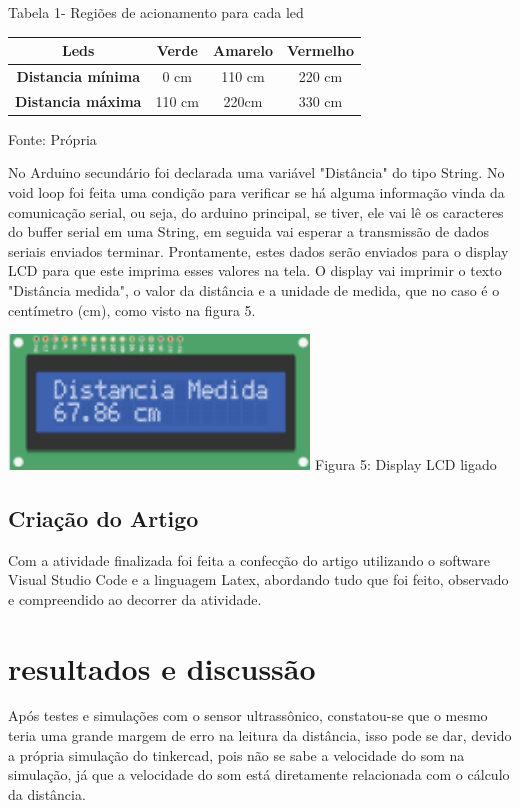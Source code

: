\documentclass[conference]{IEEEtran}
\begin{document}
\begin{center}
   Tabela 1- Regiões de acionamento para cada led
\end{center}
\begin{tabular}{c|c|c|c}\hline
\textbf{Leds} & \textbf{Verde} & \textbf{Amarelo} & \textbf{Vermelho}  \\\hline
   \textbf{Distancia mínima}  & 0 cm & 110 cm & 220 cm \\
     \textbf{Distancia máxima} & 110 cm & 220cm & 330 cm \\ 
\end{tabular}
\begin{center}
  Fonte: Própria
\end{center}

 No Arduino secundário foi declarada uma variável "Distância" do tipo String. No void loop foi feita uma condição para verificar se há alguma informação vinda da comunicação serial, ou seja, do arduino principal, se tiver, ele vai lê os caracteres do buffer serial em uma String, em seguida vai esperar a transmissão de dados seriais enviados terminar. Prontamente, estes dados serão enviados para o display LCD para que este imprima esses valores na tela. O display vai imprimir o texto "Distância medida", o valor da distância e a unidade de medida, que no caso é o centímetro (cm), como visto na figura 5.
\begin{center}
    \includegraphics[width=8cm]{LCD-on.png}
    Figura 5: Display LCD ligado
\end{center}

\subsection{Criação do Artigo}
Com a atividade finalizada foi feita a confecção do artigo utilizando o software Visual Studio Code e a linguagem Latex, abordando tudo que foi feito, observado e compreendido ao decorrer da atividade.
\section{resultados e discussão}
Após testes e simulações com o sensor ultrassônico, constatou-se que o mesmo teria uma grande margem de erro na leitura da distância, isso pode se dar, devido a própria simulação do tinkercad, pois não se sabe a velocidade do som na simulação, já que a velocidade do som está diretamente relacionada com o cálculo da distância. 
\end{document}

